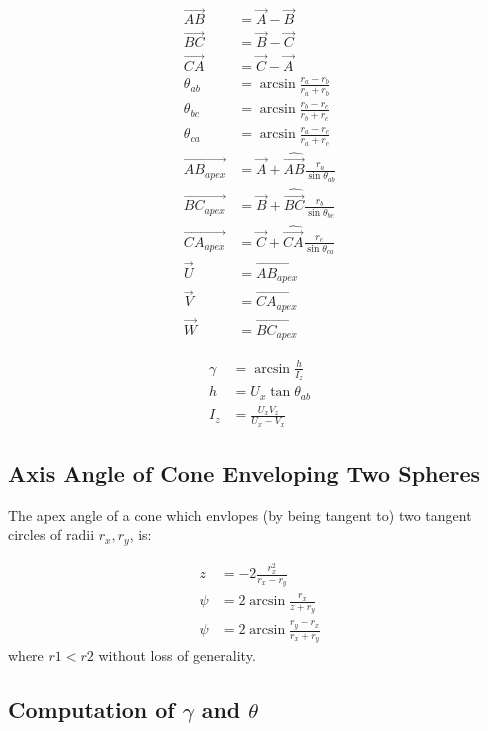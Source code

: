 \documentclass{article}
\begin{document}
\begin{align}
  \overrightarrow{AB} &= \overrightarrow{A} - \overrightarrow{B} \\
  \overrightarrow{BC} &= \overrightarrow{B} - \overrightarrow{C} \\
  \overrightarrow{CA} &= \overrightarrow{C} - \overrightarrow{A} \\
  \theta_{ab} &= \arcsin{\frac{r_a - r_b}{r_a + r_b}} \\
  \theta_{bc} &= \arcsin{\frac{r_b - r_c}{r_b + r_c}} \\
  \theta_{ca} &= \arcsin{\frac{r_a - r_c}{r_a + r_c}} \\
  \overrightarrow{AB_{apex}} &= \overrightarrow{A} + \hat{\overrightarrow{AB}} \frac{r_a}{\sin{\theta_{ab}}} \\
  \overrightarrow{BC_{apex}} &= \overrightarrow{B} + \hat{\overrightarrow{BC}} \frac{r_b}{\sin{\theta_{bc}}} \\
  \overrightarrow{CA_{apex}} &= \overrightarrow{C} + \hat{\overrightarrow{CA}} \frac{r_c}{\sin{\theta_{ca}}} \\
  \overrightarrow{U} &= \overrightarrow{AB_{apex}} \\
  \overrightarrow{V} &= \overrightarrow{CA_{apex}} \\
  \overrightarrow{W} &= \overrightarrow{BC_{apex}}
\end{align}

\begin{align}
 \gamma &= \arcsin{\frac{h}{I_z}}\\
h &= U_x\tan{\theta_{ab}}\\
I_z &= \frac{U_xV_z}{U_x - V_x}
\end{align}


\subsection{Axis Angle of Cone Enveloping Two Spheres}

The apex angle of a cone which envlopes (by being tangent to) two tangent
circles of radii $r_x,r_y$, is:

\begin{align}
 z &= -2 \frac{r_x^2}{r_x - r_y}\\
 \psi &= 2 \arcsin{\frac{r_x}{z + r_y}} \\
 \psi &= 2 \arcsin{\frac{r_y - r_x}{r_x + r_y}}
\end{align}
where $r1 < r2$ without loss of generality.

\subsection{Computation of $\gamma$ and $\theta$ }
\end{document}
